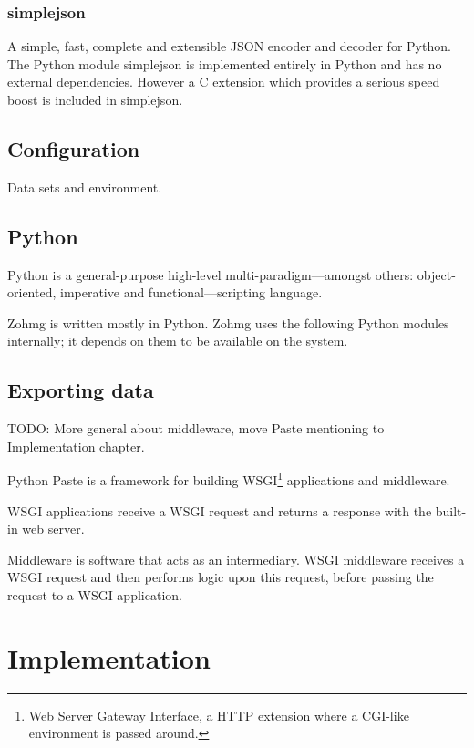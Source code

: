 \documentclass[a4paper,10pt]{book}
\begin{document}
\subsection{simplejson}

A simple, fast, complete and extensible JSON encoder and decoder for
Python. The Python module simplejson is implemented entirely in Python and
has no external dependencies. However a C extension which provides a
serious speed boost is included in simplejson. \cite{simplejson}


\section{Configuration}

Data sets and environment.


\section{Python}

Python is a general-purpose high-level multi-paradigm---amongst others:
object-oriented, imperative and functional---scripting language.
\cite{python}

Zohmg is written mostly in Python. Zohmg uses the following Python modules
internally; it depends on them to be available on the system.


\section{Exporting data}

TODO: More general about middleware, move Paste mentioning to Implementation
chapter.

Python Paste is a framework for building WSGI\footnote{Web Server Gateway
Interface, a HTTP extension where a CGI-like environment is passed around.}
applications and middleware. \cite{definitive_guide_to_pylons}

WSGI applications receive a WSGI request and returns a response with the
built-in web server.

Middleware is software that acts as an intermediary. WSGI middleware
receives a WSGI request and then performs logic upon this request, before
passing the request to a WSGI application. \cite{paste}



\chapter{Implementation}
\end{document}
